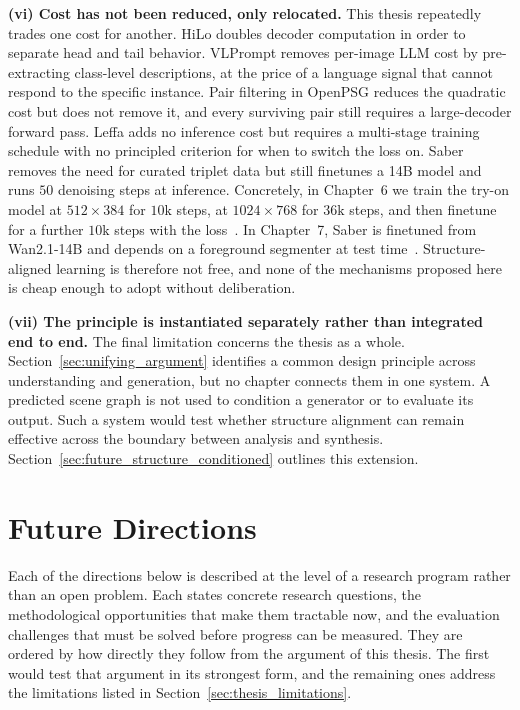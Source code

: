 \noindent \textbf{(vi) Cost has not been reduced, only relocated.}
This thesis repeatedly trades one cost for another. HiLo doubles decoder computation in order to separate head and tail behavior. VLPrompt removes per-image LLM cost by pre-extracting class-level descriptions, at the price of a language signal that cannot respond to the specific instance. Pair filtering in OpenPSG reduces the quadratic cost but does not remove it, and every surviving pair still requires a large-decoder forward pass. Leffa adds no inference cost but requires a multi-stage training schedule with no principled criterion for when to switch the loss on. Saber removes the need for curated triplet data but still finetunes a 14B model and runs $50$ denoising steps at inference. Concretely, in Chapter~6 we train the try-on model at $512 \times 384$ for $10\text{k}$ steps, at $1024 \times 768$ for $36\text{k}$ steps, and then finetune for a further $10\text{k}$ steps with the \leffa{} loss~\citep{rombach2022high, zhou2025learning}. In Chapter~7, Saber is finetuned from Wan2.1-14B and depends on a foreground segmenter at test time~\citep{wan2025wan, zhou2025scaling}. Structure-aligned learning is therefore not free, and none of the mechanisms proposed here is cheap enough to adopt without deliberation.

\noindent \textbf{(vii) The principle is instantiated separately rather than integrated end to end.}
The final limitation concerns the thesis as a whole. Section~\ref{sec:unifying_argument} identifies a common design principle across understanding and generation, but no chapter connects them in one system. A predicted scene graph is not used to condition a generator or to evaluate its output. Such a system would test whether structure alignment can remain effective across the boundary between analysis and synthesis. Section~\ref{sec:future_structure_conditioned} outlines this extension.

\section{Future Directions}
Each of the directions below is described at the level of a research program rather than an open problem. Each states concrete research questions, the methodological opportunities that make them tractable now, and the evaluation challenges that must be solved before progress can be measured. They are ordered by how directly they follow from the argument of this thesis. The first would test that argument in its strongest form, and the remaining ones address the limitations listed in Section~\ref{sec:thesis_limitations}.

